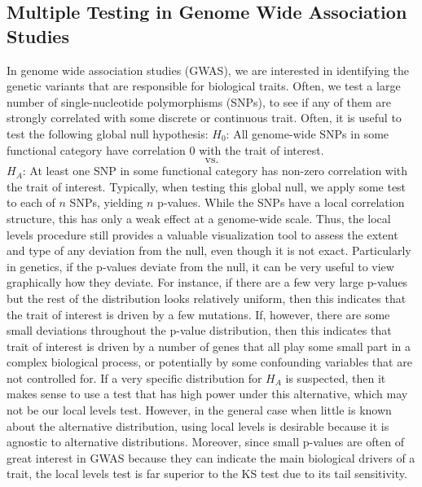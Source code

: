 \documentclass[article]{jss}
\begin{document}
\subsection{Multiple Testing in Genome Wide Association Studies}
In genome wide association studies (GWAS), we are interested in identifying the genetic variants that are responsible for biological traits. Often, we test a large number of single-nucleotide polymorphisms (SNPs), to see if any of them are strongly correlated with some discrete or continuous trait. Often, it is useful to test the following global null hypothesis:
\newline
\newline
$H_{0}$: All genome-wide SNPs in some functional category have correlation 0 with the trait of interest.
%
\begin{equation*}
\textrm{ vs. }
\end{equation*}
%
\noindent$H_{A}$: At least one SNP in some functional category has non-zero correlation with the trait of interest.
\newline
\newline
Typically, when testing this global null, we apply some test to each of $n$ SNPs, yielding $n$ p-values. While the SNPs have a local correlation structure, this has only a weak effect at a genome-wide scale. Thus, the local levels procedure still provides a valuable visualization tool to assess the extent and type of any deviation from the null, even though it is not exact. Particularly in genetics, if the p-values deviate from the null, it can be very useful to view graphically how they deviate. For instance, if there are a few very large p-values but the rest of the distribution looks relatively uniform, then this indicates that the trait of interest is driven by a few mutations. If, however, there are some small deviations throughout the p-value distribution, then this indicates that trait of interest is driven by a number of genes that all play some small part in a complex biological process, or potentially by some confounding variables that are not controlled for.
\newline
\newline
If a very specific distribution for $H_{A}$ is suspected, then it makes sense to use a test that has high power under this alternative, which may not be our local levels test. However, in the general case when little is known about the alternative distribution, using local levels is desirable because it is agnostic to alternative distributions. Moreover, since small p-values are often of great interest in GWAS because they can indicate the main biological drivers of a trait, the local levels test is far superior to the KS test due to its tail sensitivity.
\end{document}
